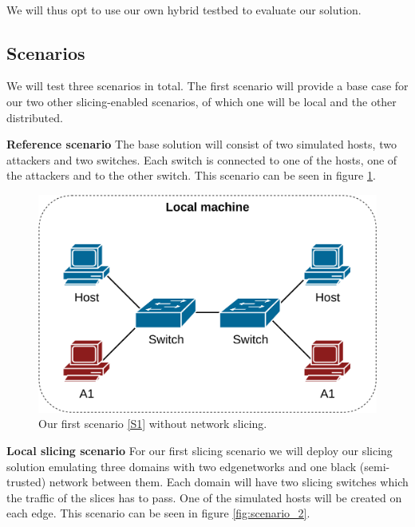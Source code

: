\paragraph{} We will thus opt to use our own hybrid testbed to evaluate our solution.

\subsection{Scenarios}
\label{scenarios}
We will test three scenarios in total. The first scenario will provide a base case for our two other slicing-enabled scenarios, of which one will be local and the other distributed.

\begin{description}[style=multiline, labelwidth=0.7cm]
    \item[\namedlabel{S1}{S1}] \textbf{Reference scenario} The base solution will consist of two simulated hosts, two attackers and two switches. Each switch is connected to one of the hosts, one of the attackers and to the other switch. This scenario can be seen in figure \ref{fig:scenario_1}.
    \begin{figure}[ht]
        \centering
        \includegraphics[width=12cm]{images/chapter_7/scenario_1.png}
        \caption[Validation Scenario 1]{Our first scenario \ref{S1} without network slicing.}
        \label{fig:scenario_1}
    \end{figure}
    \item[\namedlabel{S2}{S2}] \textbf{Local slicing scenario} For our first slicing scenario we will deploy our slicing solution emulating three domains with two \gls{edgenetwork}s and one black (semi-trusted) network between them. Each domain will have two slicing switches which the traffic of the slices has to pass. One of the simulated hosts will be created on each edge. This scenario can be seen in figure \ref{fig:scenario_2}.

\end{description}
